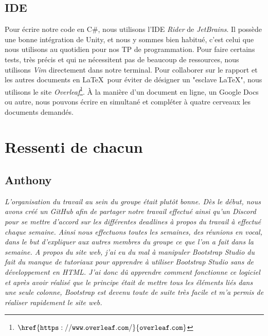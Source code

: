 \documentclass[12pt,a4paper]{article}
\begin{document}
\subsection{IDE}
Pour écrire notre code en C\#, nous utilisons l'IDE \textit{Rider} de 
\textit{JetBrains}. Il possède une bonne intégration de Unity, et nous
y sommes bien habitué, c'est celui que nous utilisons au quotidien pour
nos TP de programmation. Pour faire certains tests, très précis et qui
ne nécessitent pas de beaucoup de ressources, nous utilisons \textit{Vim}
directement dans notre terminal.
Pour collaborer sur le rapport et les autres documents en \LaTeX\, 
pour éviter de désigner un "esclave \LaTeX", nous utilisons le site 
\textit{Overleaf}\footnote{\(\mathtt{\href{https://www.overleaf.com/}
{overleaf.com}}\)}. À la manière d'un document en ligne, un Google Docs
ou autre, nous pouvons écrire en simultané et compléter à quatre cerveaux
les documents demandés.

\clearpage

\section{Ressenti de chacun}
\subsection{Anthony}
\textit{L’organisation du travail au sein du groupe était plutôt bonne.
    Dès le début, nous avons créé un GitHub afin de partager notre travail 
    effectué ainsi qu’un Discord pour se mettre d’accord sur les différentes 
    deadlines à propos du travail à effectué chaque semaine. Ainsi nous 
    effectuons toutes les semaines, des réunions en vocal, dans le but 
    d’expliquer aux autres membres du groupe ce que l’on a fait dans la 
    semaine. A propos du site web, j’ai eu du mal à manipuler Bootstrap Studio 
    du fait du manque de tutoriaux pour apprendre à utiliser Bootstrap Studio
    sans de développement en HTML. J’ai donc dû apprendre comment fonctionne 
    ce logiciel et après avoir réalisé que le principe était de mettre tous 
    les éléments liés dans une seule colonne, Bootstrap est devenu toute de 
suite très facile et m’a permis de réaliser rapidement le site web.}
\end{document}
